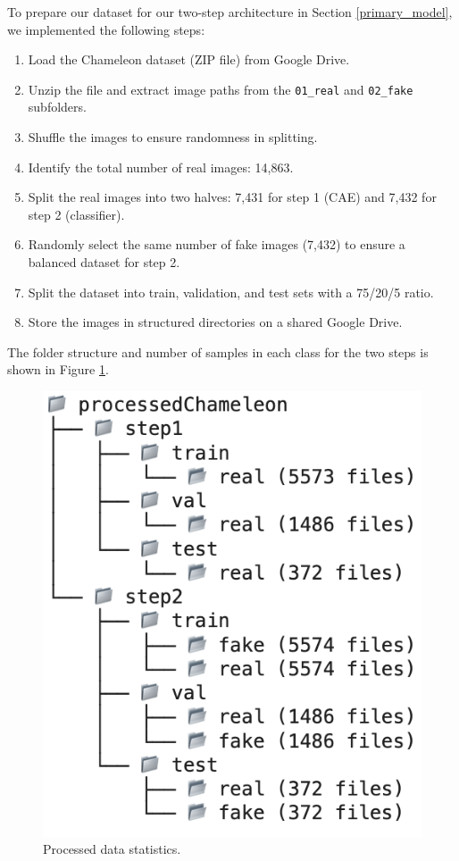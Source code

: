 \documentclass{article} %
\begin{document}
To prepare our dataset for our two-step architecture in Section \ref{primary_model}, we implemented the following steps:
\begin{enumerate}
    \item Load the Chameleon dataset (ZIP file) from Google Drive.
    \item Unzip the file and extract image paths from the \texttt{01\_real} and \texttt{02\_fake} subfolders.
    \item Shuffle the images to ensure randomness in splitting.
    \item Identify the total number of real images: 14,863.
    \item Split the real images into two halves: 7,431 for step 1 (CAE) and 7,432 for step 2 (classifier).
    \item Randomly select the same number of fake images (7,432) to ensure a balanced dataset for step 2.
    \item Split the dataset into train, validation, and test sets with a 75/20/5 ratio.
    \item Store the images in structured directories on a shared Google Drive.
\end{enumerate}

The folder structure and number of samples in each class for the two steps is shown in Figure \ref{fig:cleaned_statistic}.

\begin{figure}[h]
    \begin{center}
        \includegraphics[scale=0.5]{figs/cleaned_statistic.png}
    \end{center}
    \caption{Processed data statistics.}
    \label{fig:cleaned_statistic}
\end{figure}
\end{document}
